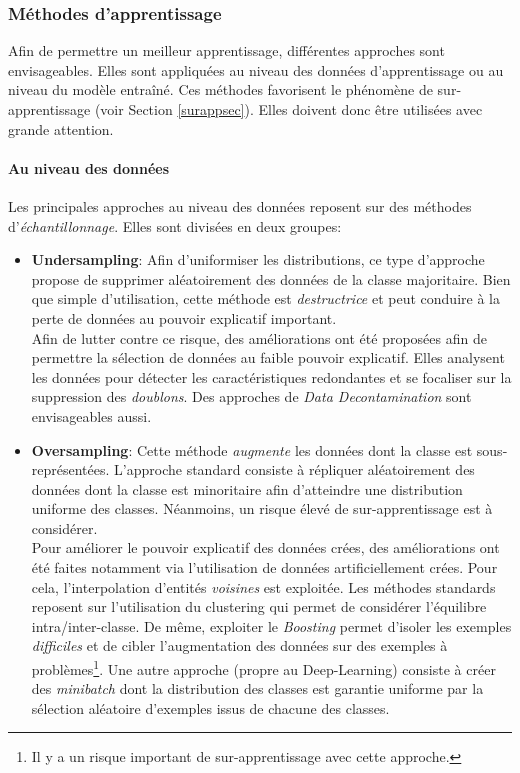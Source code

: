 \subsubsection{Méthodes d'apprentissage}
Afin de permettre un meilleur apprentissage, différentes approches sont envisageables. Elles sont appliquées au niveau des données d'apprentissage ou au niveau du modèle entraîné. Ces méthodes favorisent le phénomène de sur-apprentissage (voir Section \ref{surappsec}). Elles doivent donc être utilisées avec grande attention.\\

\paragraph{Au niveau des données}
Les principales approches au niveau des données reposent sur des méthodes d'\textit{échantillonnage}. Elles sont divisées en deux groupes:

\begin{itemize}
    \item \textbf{Undersampling}: Afin d'uniformiser les distributions, ce type d'approche propose de supprimer aléatoirement des données de la classe majoritaire. Bien que simple d'utilisation, cette méthode est \textit{destructrice} et peut conduire à la perte de données au pouvoir explicatif important.\\

    Afin de lutter contre ce risque, des améliorations ont été proposées afin de permettre la sélection de données au faible pouvoir explicatif. Elles analysent les données pour détecter les caractéristiques redondantes et se focaliser sur la suppression des \textit{doublons}. Des approches de \textit{Data Decontamination} sont envisageables aussi.

    \item \textbf{Oversampling}: Cette méthode \textit{augmente} les données dont la classe est sous-représentées. L'approche standard consiste à répliquer aléatoirement des données dont la classe est minoritaire afin d'atteindre une distribution uniforme des classes. Néanmoins, un risque élevé de sur-apprentissage est à considérer.\\

    Pour améliorer le pouvoir explicatif des données crées, des améliorations ont été faites notamment via l'utilisation de données artificiellement crées. Pour cela, l'interpolation d'entités \textit{voisines} est exploitée. Les méthodes standards reposent sur l'utilisation du clustering qui permet de considérer l'équilibre intra/inter-classe. De même, exploiter le \textit{Boosting} permet d'isoler les exemples \textit{difficiles} et de cibler l'augmentation des données sur des exemples à problèmes\footnote{Il y a un risque important de sur-apprentissage avec cette approche.}. Une autre approche (propre au Deep-Learning) consiste à créer des \textit{minibatch} dont la distribution des classes est garantie uniforme par la sélection aléatoire d'exemples issus de chacune des classes.
\end{itemize}

